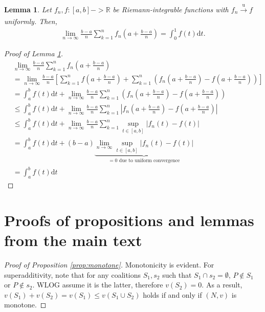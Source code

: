\documentclass[a4paper]{article}
\newtheorem{lemma}{Lemma}
\newcommand{\dt}{\mathrm{d}t}
\begin{document}
\begin{lemma}
    \label{lemma:integral_convergence}
    Let $f_n, f: [a, b] -> \mathbb{R}$ be Riemann-integrable functions with $f_n \xrightarrow[]{\mathrm{u}} f$ uniformly. Then,
    \begin{align*}
        \lim_{n \to \infty} \frac{b-a}{n} \sum_{k=1}^n f_n \left( a + \frac{b-a}{n} \right) = \int_0^1 f(t) \dt.
    \end{align*}
\end{lemma}
\begin{proof}[Proof of Lemma \ref{lemma:integral_convergence}]
    \begin{align*}
        &\lim_{n \to \infty} \frac{b-a}{n} \sum_{k=1}^n f_n \left( a + \frac{b-a}{n} \right) \\
        &= \lim_{n \to \infty} \frac{b-a}{n} \left[ \sum_{k=1}^n f \left( a + \frac{b-a}{n} \right) + \sum_{k=1}^n \left( f_n \left( a + \frac{b-a}{n} \right) - f \left( a + \frac{b-a}{n} \right) \right) \right] \\
        &= \int_a^b f(t) \dt + \lim_{n \to \infty} \frac{b-a}{n}\sum_{k=1}^n \left( f_n \left( a + \frac{b-a}{n} \right) - f \left( a + \frac{b-a}{n} \right) \right) \\
        &\leq \int_a^b f(t) \dt + \lim_{n \to \infty} \frac{b-a}{n}\sum_{k=1}^n \left| f_n \left( a + \frac{b-a}{n} \right) - f \left( a + \frac{b-a}{n} \right) \right| \\
        &\leq \int_a^b f(t) \dt + \lim_{n \to \infty} \frac{b-a}{n}\sum_{k=1}^n \sup_{t \in [a, b]} \left| f_n(t) - f(t) \right| \\
        &= \int_a^b f(t) \dt + (b-a) \underbrace{\lim_{n \to \infty} \sup_{t \in [a, b]} \left| f_n(t) - f(t) \right|}_{=0 \text{ due to uniform convergence}} \\
        &= \int_a^b f(t) \dt
    \end{align*}
\end{proof}


\section{Proofs of propositions and lemmas from the main text}

\begin{proof}[Proof of Proposition \ref{prop:monotone}]
    Monotonicity is evident. For superadditivity, note that for any coalitions $S_1, s_2$ such that $S_1 \cap s_2 = \emptyset$, $P \notin S_1$ or $P \notin s_2$. WLOG assume it is the latter, therefore $v(S_2) = 0$. As a result, $v(S_1) + v(S_2) = v(S_1) \leq v(S_1 \cup S_2)$ holds if and only if $(N, v)$ is monotone.
\end{proof}
\end{document}
